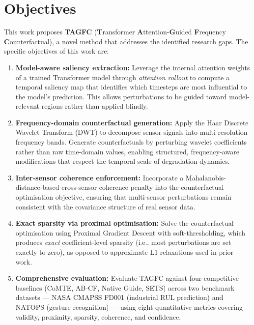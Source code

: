 \section{Objectives}

This work proposes \textbf{TAGFC} (\textbf{T}ransformer \textbf{A}ttention-\textbf{G}uided \textbf{F}requency \textbf{C}ounterfactual), a novel method that addresses the identified research gaps. The specific objectives of this work are:

\begin{enumerate}
    \item \textbf{Model-aware saliency extraction:} Leverage the internal attention weights of a trained Transformer model through \emph{attention rollout} to compute a temporal saliency map that identifies which timesteps are most influential to the model's prediction. This allows perturbations to be guided toward model-relevant regions rather than applied blindly.

    \item \textbf{Frequency-domain counterfactual generation:} Apply the Haar Discrete Wavelet Transform (DWT) to decompose sensor signals into multi-resolution frequency bands. Generate counterfactuals by perturbing wavelet coefficients rather than raw time-domain values, enabling structured, frequency-aware modifications that respect the temporal scale of degradation dynamics.

    \item \textbf{Inter-sensor coherence enforcement:} Incorporate a Mahalanobis-distance-based cross-sensor coherence penalty into the counterfactual optimisation objective, ensuring that multi-sensor perturbations remain consistent with the covariance structure of real sensor data.

    \item \textbf{Exact sparsity via proximal optimisation:} Solve the counterfactual optimisation using Proximal Gradient Descent with soft-thresholding, which produces \emph{exact} coefficient-level sparsity (i.e., most perturbations are set exactly to zero), as opposed to approximate L1 relaxations used in prior work.

    \item \textbf{Comprehensive evaluation:} Evaluate TAGFC against four competitive baselines (CoMTE, AB-CF, Native Guide, SETS) across two benchmark datasets — NASA CMAPSS FD001 (industrial RUL prediction) and NATOPS (gesture recognition) — using eight quantitative metrics covering validity, proximity, sparsity, coherence, and confidence.
\end{enumerate}

